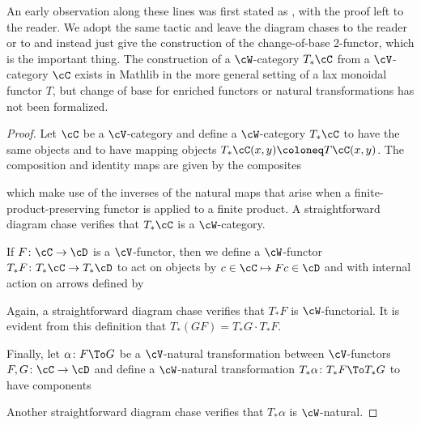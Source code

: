 An early observation along these lines was first stated as \cite[II.6.3]{EilenbergKelly:1966cc}, with the proof left to the reader. We adopt the same tactic and leave the diagram chases to the reader or to \cite[4.2.4]{Cruttwell:2008rr} and instead just give the construction of the change-of-base 2-functor, which is the important thing. The construction of a $\cW$-category $T_*\cC$ from a $\cV$-category $\cC$ exists in Mathlib in the more general setting of a lax monoidal functor $T$, but change of base for enriched functors or natural transformations has not been formalized.

\begin{proof}
    Let $\cC$ be a $\cV$-category and define a $\cW$-category $T_*\cC$ to have the same objects and to have mapping objects $T_*\cC(x,y) \coloneq T\cC(x,y)$. The composition and identity maps are given by the composites
\begin{center}
\end{center}
which make use of the inverses of the natural maps that arise when a finite-product-preserving functor is applied to a finite product. A straightforward diagram chase verifies that $T_*\cC$ is a $\cW$-category.

If $F \colon \cC \to \cD$ is a $\cV$-functor, then we define a $\cW$-functor $T_*F \colon T_*\cC \to T_*\cD$ to act on objects by $c \in\cC \mapsto Fc \in \cD$ and with internal action on arrows defined by
\begin{center} 
\end{center}
Again, a straightforward diagram chase verifies that $T_*F$ is $\cW$-functorial. It is evident from this definition that $T_*(GF) = T_*G \cdot T_*F$.

Finally, let $\alpha \colon F \To G$ be a $\cV$-natural transformation between $\cV$-functors $F,G \colon \cC\to \cD$ and define a $\cW$-natural transformation $T_*\alpha \colon T_* F \To T_*G$ to have components
\begin{center}
\end{center}
Another straightforward diagram chase verifies that $T_*\alpha$ is $\cW$-natural.


\end{proof}
